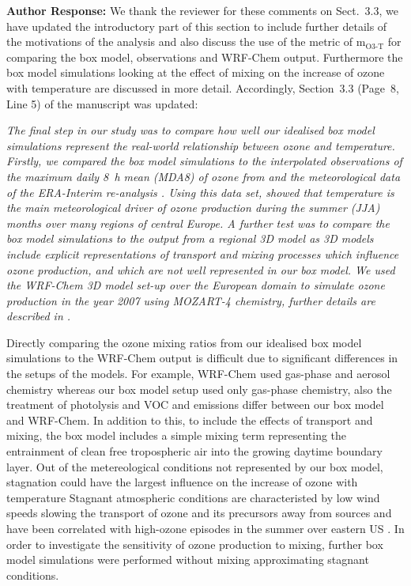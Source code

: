 \documentclass{article}
\begin{document}
\textbf{Author Response:} We thank the reviewer for these comments on Sect.~3.3, we have updated the introductory part of this section to include further details of the motivations of the analysis and also discuss the use of the metric of m$_{\text{O3-T}}$ for comparing the box model, observations and WRF-Chem output. Furthermore the box model simulations looking at the effect of mixing on the increase of ozone with temperature are discussed in more detail. Accordingly, Section~3.3 (Page~8, Line 5) of the manuscript was updated:
{\itshape
The final step in our study was to compare how well our idealised box model simulations represent the real-world relationship between ozone and temperature.
Firstly, we compared the box model simulations to the interpolated observations of the maximum daily 8~h mean (MDA8) of ozone from \citet{Schnell:2015} and the meteorological data of the ERA-Interim re-analysis \citep{Dee:2011}. 
Using this data set, \citet{Otero:2016} showed that temperature is the main meteorological driver of ozone production during the summer (JJA) months over many regions of central Europe.
A further test was to compare the box model simulations to the output from a regional 3D model as 3D models include explicit representations of transport and mixing processes which influence ozone production, and which are not well represented in our box model.
We used the WRF-Chem 3D model set-up over the European domain to simulate ozone production in the year 2007 using MOZART-4 chemistry, further details are described in \citet{Mar:2016}.

Directly comparing the ozone mixing ratios from our idealised box model simulations to the WRF-Chem output is difficult due to significant differences in the setups of the models.
For example, WRF-Chem used gas-phase and aerosol chemistry whereas our box model setup used only gas-phase chemistry, also the treatment of photolysis and VOC and  emissions differ between our box model and WRF-Chem.
In addition to this, to include the effects of transport and mixing, the box model includes a simple mixing term representing the entrainment of clean free tropospheric air into the growing daytime boundary layer.
Out of the metereological conditions not represented by our box model, stagnation could have the largest influence on the increase of ozone with temperature
Stagnant atmospheric conditions are characteristed by low wind speeds slowing the transport of ozone and its precursors away from sources and have been correlated with high-ozone episodes in the summer over eastern US \citep{Jacob:1993}.
In order to investigate the sensitivity of ozone production to mixing, further box model simulations were performed without mixing approximating stagnant conditions. 

}
\end{document}
